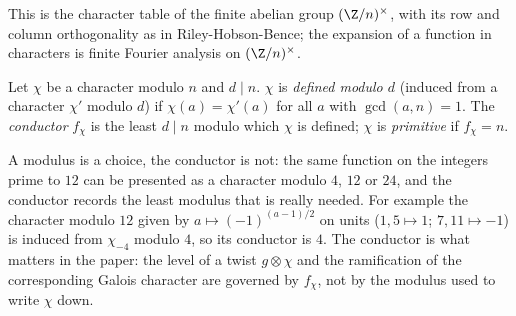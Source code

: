 This is the character table of the finite abelian group $(\Z/n)^\times$, with its row and column orthogonality as in
Riley-Hobson-Bence; the expansion of a function in characters is finite Fourier analysis on $(\Z/n)^\times$.

\begin{definition}\label{def:rings:conductor}
Let $\chi$ be a character modulo $n$ and $d\mid n$. $\chi$ is \emph{defined modulo $d$} (induced from a character $\chi'$ modulo $d$) if $\chi(a)=\chi'(a)$ for
all $a$ with $\gcd(a,n)=1$. The \emph{conductor} $f_\chi$ is the least $d\mid n$ modulo which $\chi$ is defined; $\chi$ is \emph{primitive} if $f_\chi=n$.
\end{definition}

A modulus is a choice, the conductor is not: the same function on the integers prime to $12$ can be presented as a character modulo $4$,
$12$ or $24$, and the conductor records the least modulus that is really needed. For example the character modulo $12$ given by
$a\mapsto(-1)^{(a-1)/2}$ on units ($1,5\mapsto1$; $7,11\mapsto-1$) is induced from $\chi_{-4}$ modulo $4$, so its conductor is $4$. The conductor is what
matters in the paper: the level of a twist $g\otimes\chi$ and the ramification of the corresponding Galois character are governed by $f_\chi$,
not by the modulus used to write $\chi$ down.

